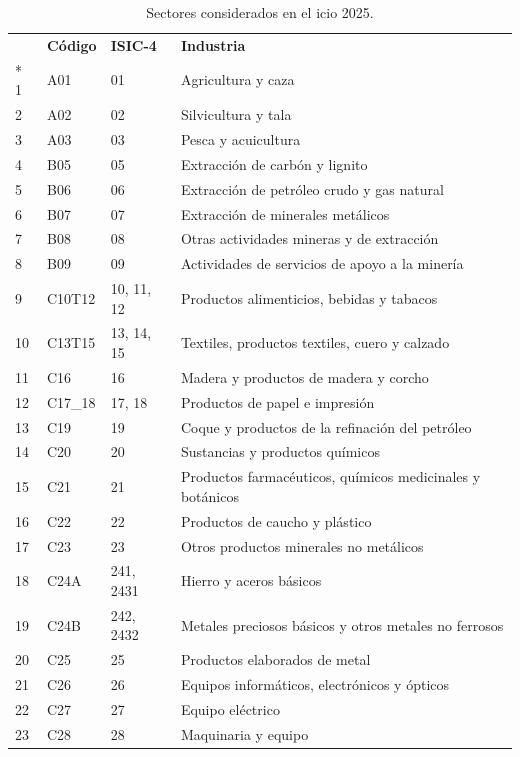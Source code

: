 \begin{longtable}{@{} l l l p{9cm} @{} }
	\caption{Sectores considerados en el \gls{icio} 2025.}
	\label{ICIO25_Industrias}\\
	\toprule
	\textbf{} & \textbf{Código} & \textbf{ISIC-4} & \textbf{Industria} \\* \midrule
	\endhead
	\bottomrule
	\endfoot
	\endlastfoot
	1 & A01 & 01 & Agricultura y caza \\
	2 & A02 & 02 & Silvicultura y tala \\
	3 & A03 & 03 & Pesca y acuicultura \\
	4 & B05 & 05 & Extracción de carbón y lignito \\
	5 & B06 & 06 & Extracción de petróleo crudo y gas natural\\
	6 & B07 & 07 & Extracción de minerales metálicos \\
	7 & B08 & 08 & Otras actividades mineras y de extracción\\
	8 & B09 & 09 & Actividades de servicios de apoyo a la minería \\
	9 & C10T12 & 10, 11, 12 & Productos alimenticios, bebidas y tabacos \\
	10 & C13T15 & 13, 14, 15 & Textiles, productos textiles, cuero y calzado \\
	11 & C16 & 16 & Madera y productos de madera y corcho \\
	12 & C17\_18 & 17, 18 & Productos de papel e impresión \\
	13 & C19 & 19 & Coque y productos de la refinación del petróleo \\
	14 & C20 & 20 & Sustancias y productos químicos \\
	15 & C21 & 21 & Productos farmacéuticos, químicos medicinales y botánicos \\
	16 & C22 & 22 & Productos de caucho y plástico \\
	17 & C23 & 23 & Otros productos minerales no metálicos \\
	18 & C24A & 241, 2431 & Hierro y aceros básicos \\
	19 & C24B & 242, 2432 & Metales preciosos básicos y otros metales no ferrosos \\
	20 & C25 & 25 & Productos elaborados de metal \\
	21 & C26 & 26 & Equipos informáticos, electrónicos y ópticos \\
	22 & C27 & 27 & Equipo eléctrico \\
	23 & C28 & 28 & Maquinaria y equipo \\

\end{longtable}
